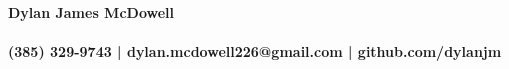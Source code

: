 \message{ !name(cv_12 copy.tex)}\documentclass[letterpaper]{deedy-resume}
\begin{document}


\begin{flushleft}
  {\Huge \textbf{Dylan James McDowell}\\}
  \vspace{-3.5mm}
  {\large\textbf{\\ (385) 329-9743 | dylan.mcdowell226@gmail.com | github.com/dylanjm }}
\end{flushleft}


\vspace{-3mm}
\hspace{-6.5mm}
\end{document}
